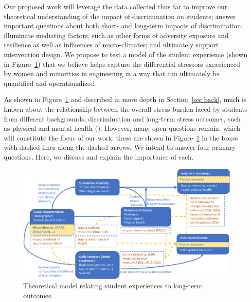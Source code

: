 Our proposed work will leverage the data collected thus far to improve our theoretical understanding of the impact of discrimination on students; answer important questions about both short- and long-term impacts of discrimination; illuminate mediating factors, such as other forms of adversity exposure and resilience as well as influences of micro-climates; and ultimately support intervention design.  We  propose to test a model of the student experience (shown in Figure~\ref{fig:model}) that we believe helps capture the differential stressors experienced by women and minorities in engineering in a way that can ultimately be quantified and operationalized. 


As shown in Figure~\ref{fig:model} and described in more depth in Section~\ref{sec:back}, much is known about the relationship between the overall stress burden faced by students from different backgrounds, discrimination and long-term stress outcomes, such as physical and mental health  (\eg \cite{Ong:2009}). However, many open questions remain, which will constitute the focus of our work; these are shown in Figure~\ref{fig:model} in the boxes with dashed lines along the dashed arrows. We intend to answer four primary questions.  Here, we discuss and explain the importance of each.

\begin{figure}
    \centering
    \includegraphics[width=12cm]{img/discrimination-model.png}
    \caption{Theoretical model relating student experiences to long-term outcomes.}
    \label{fig:model}
\end{figure}


